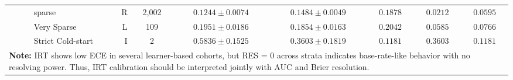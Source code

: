 \begin{table}[htbp]
{\begin{tabular}{lllrcccccc}
 &  & sparse & R & 2,002 & $0.1244 \pm 0.0074$ & $0.1484 \pm 0.0049$ & $0.1878$ & $0.0212$ & $0.0595$ \\
 &  & Very Sparse & L & 109 & $0.1951 \pm 0.0186$ & $0.1854 \pm 0.0163$ & $0.2042$ & $0.0585$ & $0.0766$ \\
 &  & Strict Cold-start & I & 2 & $0.5836 \pm 0.1525$ & $0.3603 \pm 0.1819$ & $0.1181$ & $0.3603$ & $0.1181$ \\
\bottomrule
\multicolumn{10}{p{17.5cm}}{\scriptsize \textbf{Note:} IRT shows low ECE in several learner-based cohorts, but RES = 0 across strata indicates base-rate-like behavior with no resolving power. Thus, IRT calibration should be interpreted jointly with AUC and Brier resolution.} \\
\end{tabular}%
}
\end{table}
